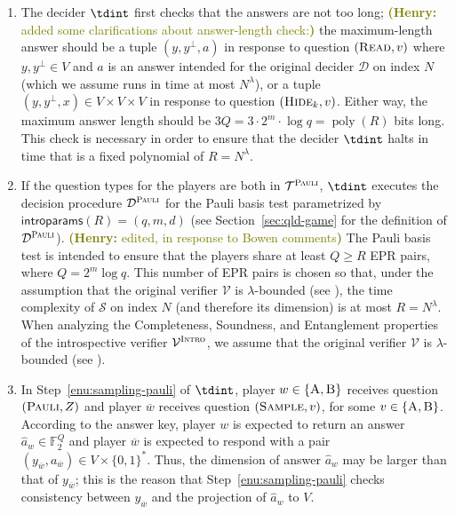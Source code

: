 \documentclass[11pt]{article}
\theoremstyle{definition}
\newcommand{\F}{\ensuremath{\mathbb{F}}}
\DeclareMathOperator{\poly}{poly}
\newcommand{\sampler}{\mathcal{S}}
\newcommand{\decider}{\mathcal{D}}
\newcommand{\verifier}{\mathcal{V}}
\newcommand{\type}{\mathcal{T}}
\newcommand{\gamestyle}[1]{\ensuremath{\textsc{#1}}\xspace}
\newcommand{\pauli}{\gamestyle{Pauli}}
\newcommand{\intro}{\gamestyle{Intro}}
\newcommand{\labelstyle}[1]{\ensuremath{\textsc{#1}}\xspace}
\newcommand{\trole}{\ensuremath{v}}
\newcommand{\alice}{\labelstyle{A}}
\newcommand{\bob}{\labelstyle{B}}
\newcommand{\typestyle}[1]{\ensuremath{\textsc{#1}}\xspace}
\newcommand{\Pauli}{\typestyle{Pauli}}
\newcommand{\Sample}{\typestyle{Sample}}
\newcommand{\Read}{\typestyle{Read}}
\newcommand{\Hide}[1]{\typestyle{Hide}_{#1}}
\newcommand{\introparams}{\mathsf{introparams}}
\newcommand{\hnote}[1]{\textcolor{olive}{\small {\textbf{(Henry:} #1\textbf{) }}}}
\newcommand{\hnote}[1]{}
\begin{document}
\begin{enumerate}
\item The decider $\tdint$ first checks that the answers are not too
  long; \hnote{added some clarifications about answer-length check:} the maximum-length answer should be a tuple $(y, y^\perp, a)$ in response to question $(\Read,v)$ 
  where $y, y^\perp \in V$ and $a$ is an answer intended for the original
  decider $\decider$ on index $N$ (which we assume runs in time at most
  $N^\lambda$), or a tuple $(y,y^\perp,x) \in V \times V \times V$ in response to question $(\Hide{k},v)$. Either way, the maximum answer length should be $3Q = 3 \cdot 2^m \cdot \log q = \poly(R)$ bits long. 
  This check is necessary in order to ensure that the decider $\tdint$
  halts in time that is a fixed polynomial of $R = N^\lambda$.


\item If the question types for the players are both in $\type^\pauli$,
  $\tdint$ executes the decision procedure $\decider^\pauli$ for the
  Pauli basis test parametrized by $\introparams(R) = (q,m,d)$ (see
  Section~\ref{sec:qld-game} for the definition of $\decider^\pauli$).
  \hnote{edited, in response to Bowen comments} The Pauli basis test is intended to ensure that the players share at least $Q \geq R$ EPR pairs, where $Q = 2^m \log q$. This number of EPR pairs is chosen
  so that, under the assumption that the original verifier $\verifier$ is $\lambda$-bounded (see ), 
  the time complexity of $\sampler$ on index $N$ (and therefore its dimension) is at most $R = N^\lambda$. 
	When analyzing the Completeness, Soundness, and Entanglement properties of the introspective verifier $\verifier^\intro$,
	we assume that the original verifier $\verifier$ is $\lambda$-bounded (see ). 
   


\item In Step~\ref{enu:sampling-pauli} of $\tdint$, player
  $w\in\{\alice,\bob\}$ receives question $(\Pauli,Z)$ and player $\overline{w}$
  receives question $(\Sample,\trole)$, for some $v\in\{\alice,\bob\}$.
  According to the answer key, player $w$ is expected to return an answer
  $\hat{a}_w\in \F_2^Q$ and player $\overline{w}$ is expected to respond with a
  pair $(y_{\overline{w}},a_{\overline{w}}) \in V \times \{0,1\}^*$.
  Thus, the dimension of answer $\hat{a}_w$ may be larger than that of
  $y_{\overline{w}}$; this is the reason that Step~\ref{enu:sampling-pauli}
  checks consistency between $y_{\overline{w}}$ and the projection of
  $\hat{a}_w$ to $V$.




\end{enumerate}
\end{document}
